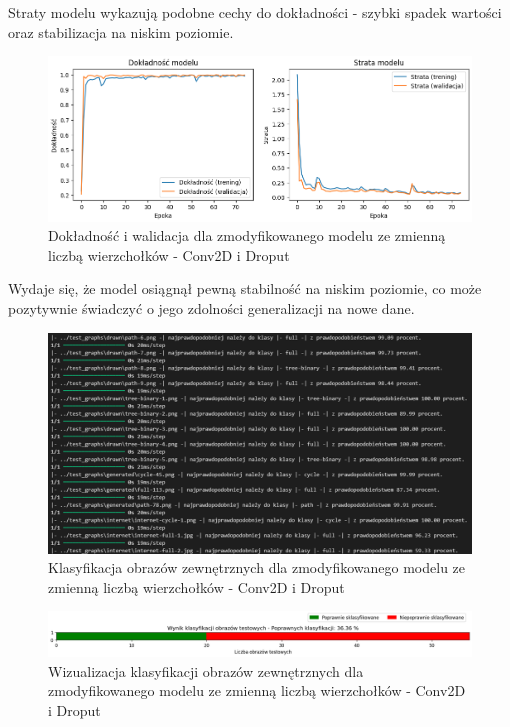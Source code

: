 Straty modelu wykazują podobne cechy do dokładności - szybki spadek wartości oraz stabilizacja na niskim poziomie.

\begin{figure}[ht]
	\centering
	\includegraphics[width=14cm]{resources/tests/images/v4/multiple_edges_1_img.png}
	\caption{Dokładność i walidacja dla zmodyfikowanego modelu ze zmienną liczbą wierzchołków - Conv2D i Droput}
	\label{Fig:tests-var-1a}
\end{figure}
\FloatBarrier

Wydaje się, że model osiągnął pewną stabilność na niskim poziomie, co może pozytywnie świadczyć o jego zdolności generalizacji na nowe dane.

\begin{figure}[ht]
	\centering
	\includegraphics[width=14cm]{resources/tests/images/v4/multiple_edges_1_txt.png}
	\caption{Klasyfikacja obrazów zewnętrznych dla zmodyfikowanego modelu ze zmienną liczbą wierzchołków - Conv2D i Droput}
	\label{Fig:tests-var-1b}
\end{figure}
\FloatBarrier

\begin{figure}[ht]
	\centering
	\includegraphics[width=14cm]{resources/tests/images/v4/multiple_edges_1_bar.png}
	\caption{Wizualizacja klasyfikacji obrazów zewnętrznych dla zmodyfikowanego modelu ze zmienną liczbą wierzchołków - Conv2D i Droput}
	\label{Fig:tests-var-0c}
\end{figure}
\FloatBarrier

